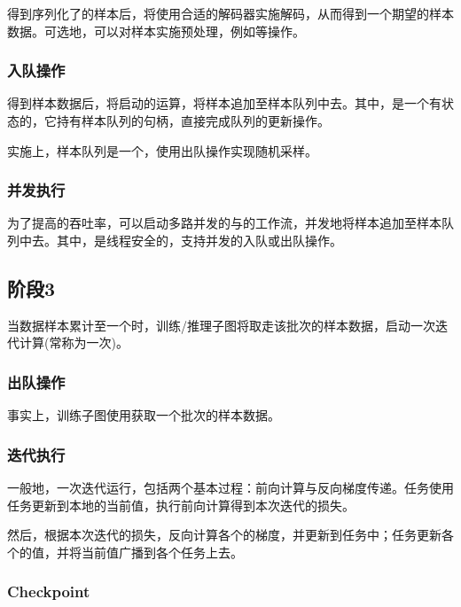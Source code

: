 \begin{content}
得到序列化了的样本后，将使用合适的解码器实施解码，从而得到一个期望的样本数据。可选地，可以对样本实施预处理，例如等操作。

\subsubsection{入队操作}

得到样本数据后，将启动的运算，将样本追加至样本队列中去。其中，是一个有状态的，它持有样本队列的句柄，直接完成队列的更新操作。

实施上，样本队列是一个，使用出队操作实现随机采样。

\subsubsection{并发执行}

为了提高的吞吐率，可以启动多路并发的与的工作流，并发地将样本追加至样本队列中去。其中，是线程安全的，支持并发的入队或出队操作。

\subsection{阶段3}

当数据样本累计至一个时，训练/推理子图将取走该批次的样本数据，启动一次迭代计算(常称为一次)。

\subsubsection{出队操作}

事实上，训练子图使用获取一个批次的样本数据。

\subsubsection{迭代执行}

一般地，一次迭代运行，包括两个基本过程：前向计算与反向梯度传递。任务使用任务更新到本地的当前值，执行前向计算得到本次迭代的损失。

然后，根据本次迭代的损失，反向计算各个的梯度，并更新到任务中；任务更新各个的值，并将当前值广播到各个任务上去。

\subsubsection{Checkpoint}


\end{content}
